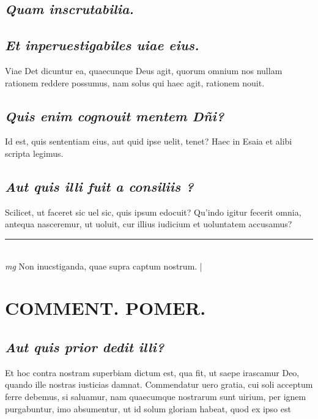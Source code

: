 \documentclass{article}
\begin{document}
\begin{pages}
\subsection*{\textit{Quam inscrutabilia. }}
{}
\subsection*{\textit{Et inperuestigabiles uiae eius. }}\pstart Viae Det dicuntur ea, quaecunque Deus agit, quorum omnium nos nullam rationem reddere possumus, nam solus qui haec agit, rationem nouit.   \pend
{}
{}
\subsection*{\textit{Quis enim cognouit mentem Dñi? }}\pstart Id est, quis sententiam eius, aut quid ipse uelit, tenet? Haec in Esaia et alibi scripta legimus.  \pend
{}
{}
\subsection*{\textit{Aut quis illi fuit a consiliis ? }}\pstart Scilicet, ut faceret sic uel sic, quis ipsum edocuit? Qu'indo igitur fecerit omnia, antequa nasceremur, ut uoluit, cur illius iudicium et uoluntatem accusamus?  \pend
\vspace{0.5cm}\noindent
\vspace{0.2cm}\rule{1cm}{0.2pt}\\ 
\hspace{0.2cm}\textit{mg}
\footnotesize Non inucstiganda, quae supra captum nostrum.  
\normalsize| 
\section*{COMMENT. POMER.  }
{}
\subsection*{\textit{Aut quis prior dedit illi? }}\pstart Et hoc contra nostram superbiam dictum est, qua fit, ut saepe irascamur Deo, quando ille nostras iusticias damnat. Commendatur uero gratia, cui soli acceptum ferre debemus, si saluamur, nam quaecumque nostrarum sunt uirium, per ignem purgabuntur, imo absumentur, ut id solum gloriam habeat, quod ex ipso est\pend
{}
{}

\end{pages}
\end{document}
